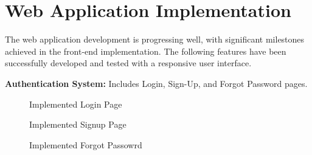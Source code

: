 \documentclass[12pt,oneside,openright,a4paper]{cpe-english-project}
\begin{document}
\section{Web Application Implementation}

The web application development is progressing well, with significant milestones achieved in the front-end implementation. The following features have been successfully developed and tested with a responsive user interface.

\textbf{Authentication System:} Includes Login, Sign-Up, and Forgot Password pages.

\begin{figure}[H]
\centering
{}
\caption{Implemented Login Page}\label{fig:auth-login}
\end{figure}

\begin{figure}[H]
\centering
{}
\caption{Implemented Signup Page}\label{fig:auth-signup}
\end{figure}

\begin{figure}[H]
\centering
{}
\caption{Implemented Forgot Passowrd}\label{fig:auth-forgotpasswd}
\end{figure}
\end{document}
